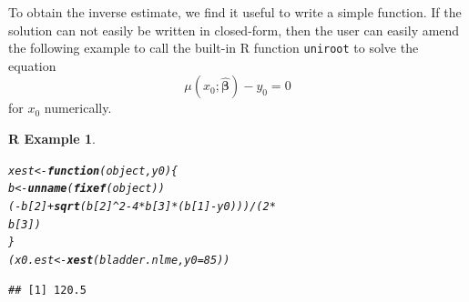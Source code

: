 \documentclass{article}\usepackage[]{graphicx}\usepackage[]{color}
\makeatletter
\newcommand{\hlnum}[1]{\textcolor[rgb]{0.686,0.059,0.569}{#1}}%
\newcommand{\hlopt}[1]{\textcolor[rgb]{0,0,0}{#1}}%
\newcommand{\hlstd}[1]{\textcolor[rgb]{0.345,0.345,0.345}{#1}}%
\newcommand{\hlkwa}[1]{\textcolor[rgb]{0.161,0.373,0.58}{\textbf{#1}}}%
\newcommand{\hlkwb}[1]{\textcolor[rgb]{0.69,0.353,0.396}{#1}}%
\newcommand{\hlkwc}[1]{\textcolor[rgb]{0.333,0.667,0.333}{#1}}%
\newcommand{\hlkwd}[1]{\textcolor[rgb]{0.737,0.353,0.396}{\textbf{#1}}}%
\newenvironment{kframe}{%
 \def\at@end@of@kframe{}%
 \ifinner\ifhmode%
  \def\at@end@of@kframe{\end{minipage}}%
  \begin{minipage}{\columnwidth}%
 \fi\fi%
 \def\FrameCommand##1{\hskip\@totalleftmargin \hskip-\fboxsep
 \colorbox{shadecolor}{##1}\hskip-\fboxsep
     \hskip-\linewidth \hskip-\@totalleftmargin \hskip\columnwidth}%
 \MakeFramed {\advance\hsize-\width
   \@totalleftmargin\z@ \linewidth\hsize
   \@setminipage}}%
 {\par\unskip\endMakeFramed%
 \at@end@of@kframe}
\newenvironment{knitrout}{}{} %
\newcommand{\proglang}[1]{\textsf{#1}}
\newcommand{\code}[1]{\texttt{#1}}
\newtheorem{rexample}{R Example}%
\makeatother
\begin{document}
To obtain the inverse estimate, we find it useful to write a simple function. If the solution can not easily be written in closed-form, then the user can easily amend the following example to call the built-in \proglang{R} function \code{uniroot} to solve the equation 
\[
  \mu\left(x_0; \widehat{\bm{\beta}}\right) - y_0 = 0
\]
for $x_0$ numerically.
\begin{knitrout}
\color{fgcolor}\begin{kframe}
\begin{rexample}\label{example-2}\hfill{}\begin{alltt}
\hlstd{xest} \hlkwb{<-} \hlkwa{function}\hlstd{(}\hlkwc{object}\hlstd{,} \hlkwc{y0}\hlstd{) \{}
    \hlstd{b} \hlkwb{<-} \hlkwd{unname}\hlstd{(}\hlkwd{fixef}\hlstd{(object))}
    \hlstd{(}\hlopt{-}\hlstd{b[}\hlnum{2}\hlstd{]} \hlopt{+} \hlkwd{sqrt}\hlstd{(b[}\hlnum{2}\hlstd{]}\hlopt{^}\hlnum{2} \hlopt{-} \hlnum{4} \hlopt{*} \hlstd{b[}\hlnum{3}\hlstd{]} \hlopt{*} \hlstd{(b[}\hlnum{1}\hlstd{]} \hlopt{-} \hlstd{y0)))}\hlopt{/}\hlstd{(}\hlnum{2} \hlopt{*}
        \hlstd{b[}\hlnum{3}\hlstd{])}
\hlstd{\}}
\hlstd{(x0.est} \hlkwb{<-} \hlkwd{xest}\hlstd{(bladder.nlme,} \hlkwc{y0} \hlstd{=} \hlnum{85}\hlstd{))}
\end{alltt}
\begin{verbatim}
## [1] 120.5
\end{verbatim}
\end{rexample}\end{kframe}
\end{knitrout}
\end{document}
